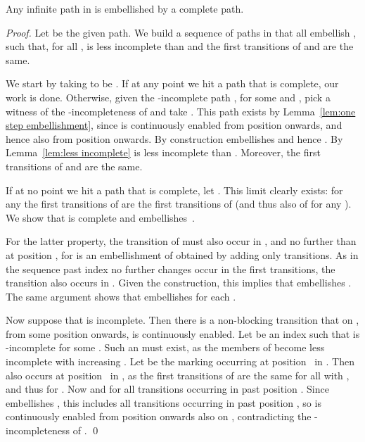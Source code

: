 \documentclass[smallcondensed]{svjour3}
\newcommand{\Lem}[1]{Lemma~\ref{lem:#1}}
\begin{document}
\begin{lemma}\label{lem:embellishment by complete path}
Any infinite path in  is embellished by a complete path.
\end{lemma}

\begin{proof}
Let  be the given path.
We build a sequence  of paths in  that all embellish , such that, for all ,
 is less incomplete than  and the first  transitions of  and  are the same.

We start by taking  to be .
If at any point we hit a path  that is complete, our work is done.
Otherwise, given the -incomplete path , for some  and ,
pick a witness  of the -incompleteness of  and take .
This path exists by \Lem{one step embellishment}, since  is continuously enabled from position
 onwards, and hence also from position  onwards.
By construction  embellishes  and hence .
By \Lem{less incomplete}  is less incomplete than .
Moreover, the first  transitions of  and  are the same.

If at no point we hit a path  that is complete, let .
This limit clearly exists: for any  the first  transitions of  are the first
 transitions of  (and thus also of  for any ).
We show that  is complete and embellishes~.

For the latter property, the  transition  of  must also occur in , and
no further than at position , for  is an embellishment of  obtained by adding only
 transitions. As in the sequence  past index  no further changes occur
in the first  transitions, the transition  also occurs in .
Given the construction, this implies that  embellishes .
The same argument shows that  embellishes  for each .

Now suppose that  is incomplete. Then there is a non-blocking transition 
that on , from some position  onwards, is continuously enabled.
Let  be an index such that  is -incomplete for some .
Such an  must exist, as the members of  become less incomplete with
increasing .
Let  be the marking occurring at position~ in .
Then  also occurs at position~ in , as the first  transitions of 
are the same for all  with , and thus for .
Now  and \mbox{} for all transitions
 occurring in  past position . Since  embellishes , this includes all transitions  occurring
in  past position , so  is continuously enabled from position  onwards also on ,
contradicting the -incompleteness of .
\qed
\end{proof}
\end{document}
